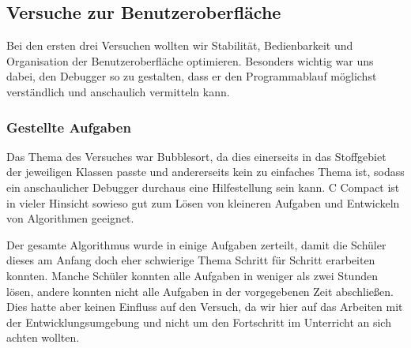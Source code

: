 

\subsection{Versuche zur Benutzeroberfläche}
\label{sec:sci-trial-gui}
Bei den ersten drei Versuchen wollten wir Stabilität, Bedienbarkeit und Organisation der Benutzeroberfläche optimieren. Besonders wichtig war uns dabei, den Debugger so zu gestalten, dass er den Programmablauf möglichst verständlich und anschaulich vermitteln kann.

\subsubsection*{Gestellte Aufgaben}
Das Thema des Versuches war Bubblesort, da dies einerseits in das Stoffgebiet der jeweiligen Klassen passte und andererseits kein zu einfaches Thema ist, sodass ein anschaulicher Debugger durchaus eine Hilfestellung sein kann. C Compact ist in vieler Hinsicht sowieso gut zum Lösen von kleineren Aufgaben und Entwickeln von Algorithmen geeignet.

Der gesamte Algorithmus wurde in einige Aufgaben zerteilt, damit die Schüler dieses am Anfang doch eher schwierige Thema Schritt für Schritt erarbeiten konnten. Manche Schüler konnten alle Aufgaben in weniger als zwei Stunden lösen, andere konnten nicht alle Aufgaben in der vorgegebenen Zeit abschließen. Dies hatte aber keinen Einfluss auf den Versuch, da wir hier auf das Arbeiten mit der Entwicklungsumgebung und nicht um den Fortschritt im Unterricht an sich achten wollten.

